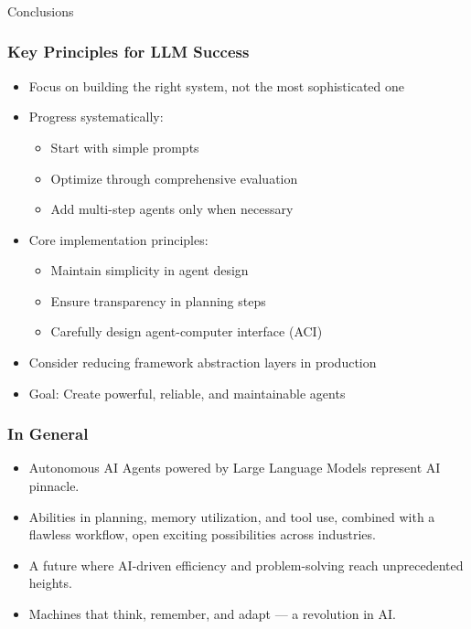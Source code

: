 \begin{frame}[fragile]\frametitle{}
\begin{center}
{\Large Conclusions}
\end{center}
\end{frame}

\begin{frame}[fragile]\frametitle{Key Principles for LLM Success}
    \begin{itemize}
        \item Focus on building the right system, not the most sophisticated one
        \item Progress systematically:
            \begin{itemize}
                \item Start with simple prompts
                \item Optimize through comprehensive evaluation
                \item Add multi-step agents only when necessary
            \end{itemize}
        \item Core implementation principles:
            \begin{itemize}
                \item Maintain simplicity in agent design
                \item Ensure transparency in planning steps
                \item Carefully design agent-computer interface (ACI)
            \end{itemize}
        \item Consider reducing framework abstraction layers in production
        \item Goal: Create powerful, reliable, and maintainable agents
    \end{itemize}
\end{frame}

\begin{frame}[fragile]\frametitle{In General}
  \begin{itemize}
    \item Autonomous AI Agents powered by Large Language Models represent AI pinnacle.
    \item Abilities in planning, memory utilization, and tool use, combined with a flawless workflow, open exciting possibilities across industries.
    \item A future where AI-driven efficiency and problem-solving reach unprecedented heights.
    \item Machines that think, remember, and adapt — a revolution in AI.
  \end{itemize}
\end{frame}


